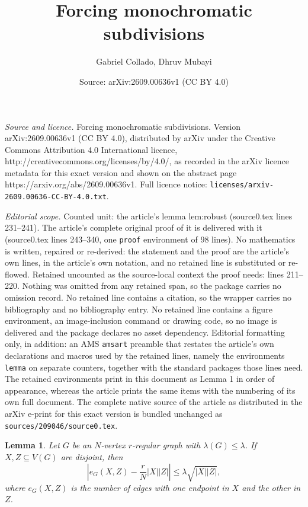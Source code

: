 \documentclass[10pt,a4paper]{amsart}
\title{Forcing monochromatic subdivisions}
\author{Gabriel Collado, Dhruv Mubayi}
\date{Source: arXiv:2609.00636v1 (CC BY 4.0)}
\newtheorem{lemma}{Lemma}
\begin{document}
\maketitle

\noindent\emph{Source and licence.} Forcing monochromatic subdivisions. Version arXiv:2609.00636v1 (CC BY 4.0), distributed by arXiv under the Creative Commons Attribution 4.0 International licence, http://creativecommons.org/licenses/by/4.0/, as recorded in the arXiv licence metadata for this exact version and shown on the abstract page https://arxiv.org/abs/2609.00636v1. Full licence notice: \texttt{licenses/arxiv-2609.00636-CC-BY-4.0.txt}.\par\smallskip

\noindent\textit{Editorial scope.} Counted unit: the article's lemma lem:robust (source0.tex lines 231--241). The article's complete original proof of it is delivered with it (source0.tex lines 243--340, one \texttt{proof} environment of 98 lines). No mathematics is written, repaired or re-derived: the statement and the proof are the article's own lines, in the article's own notation, and no retained line is substituted or re-flowed.  Retained uncounted as the source-local context the proof needs: lines 211--220.  Nothing was omitted from any retained span, so the package carries no omission record.  No retained line contains a citation, so the wrapper carries no bibliography and no bibliography entry.  No retained line contains a figure environment, an image-inclusion command or drawing code, so no image is delivered and the package declares no asset dependency.  Editorial formatting only, in addition: an AMS \texttt{amsart} preamble that restates the article's own declarations and macros used by the retained lines, namely the environments \texttt{lemma} on separate counters, together with the standard packages those lines need.  The retained environments print in this document as Lemma 1 in order of appearance, whereas the article prints the same items with the numbering of its own full document.  The complete native source of the article as distributed in the arXiv e-print for this exact version is bundled unchanged as \texttt{sources/209046/source0.tex}.
\begin{lemma}\label{lem:EML}
Let $G$ be an $N$-vertex $r$-regular graph with $\lambda(G)\le\lambda$.
If $X,Z\subseteq V(G)$ are disjoint, then
\[
\left|e_G(X,Z)-\frac{r}{N}|X||Z|\right|
   \le \lambda\sqrt{|X||Z|},
\]
where $e_G(X,Z)$ is the number of edges with one endpoint in $X$ and the
other in $Z$.
\end{lemma}
\end{document}
